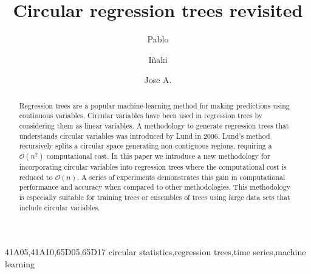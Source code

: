 \documentclass[times,twocolumn,final,authoryear]{elsarticle}
\begin{document}
\begin{frontmatter}

\title{Circular regression trees revisited}

\author[1]{Pablo }
\author[2]{I\~naki }
\author[2,3]{Jose A. }

\address[1]{National Computational Infrastructure, Building 143, Australian National University, Ward Road, ACT, 2601, Australia}
\address[2]{Intelligent Systems Group, Computer Science Faculty, University of the Basque Country, Paseo de Manuel Lardizabal, Donostia, 20018, Spain}
\address[3]{Basque Center for Applied Mathematics (BCAM), Mazarredo 14, Bilbao, 48009, Spain}





\begin{abstract}
Regression trees are a popular machine-learning method for making predictions using continuous variables. Circular variables have been used in regression trees by considering them as linear variables. A methodology to generate regression trees that understands circular variables was introduced by Lund in 2006. Lund's method recursively splits a circular space generating non-contiguous regions, requiring a $\mathcal{O}(n^2)$ computational cost. In this paper we introduce a new methodology for incorporating circular variables into regression trees where the computational cost is reduced to $\mathcal{O}(n)$. A series of experiments demonstrates this gain in computational performance and accuracy when compared to other methodologies. This methodology is especially suitable for training trees or ensembles of trees using large data sets that include circular variables.
\end{abstract}

\begin{keyword}
\MSC 41A05\sep 41A10\sep 65D05\sep 65D17
\KWD circular statistics\sep regression trees\sep time series\sep machine learning

\end{keyword}

\end{frontmatter}
\end{document}
